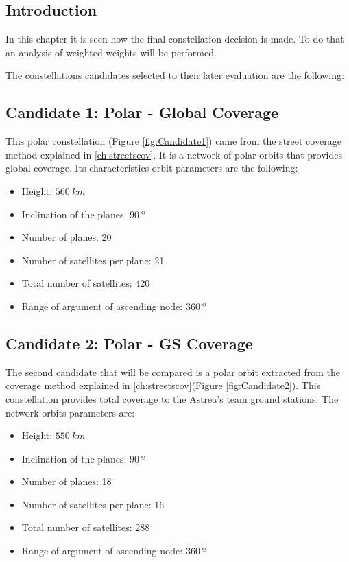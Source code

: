 \subsection{Introduction} 
In this chapter it is seen how the final constellation decision is made. To do that an analysis of weighted weights will be performed.

The constellations candidates selected to their later evaluation are the following:

\subsection{Candidate 1: Polar - Global Coverage}

This polar constellation (Figure \ref{fig:Candidate1}) came from the street coverage method explained in \ref{ch:streetscov}. It is a network of polar orbits that provides global coverage. Its characteristics orbit parameters are the following:

\begin{itemize}
\item Height: $560~{km}$ 
\item Inclination of the planes: $90~{º}$  
\item Number of planes: 20
\item Number of satellites per plane: 21
\item Total number of satellites: 420
\item Range of argument of ascending node: $360~{º}$ 
\end{itemize}


\subsection{Candidate 2: Polar - GS Coverage}
 
The second candidate that will be compared is a polar orbit extracted from the coverage method explained in \ref{ch:streetscov}(Figure \ref{fig:Candidate2}). This constellation provides total coverage to the Astrea's team ground stations. The network orbits parameters are:

\begin{itemize}
\item Height: $550~{km}$ 
\item Inclination of the planes: $90~{º}$  
\item Number of planes: 18
\item Number of satellites per plane: 16
\item Total number of satellites: 288
\item Range of argument of ascending node: $360~{º}$ 
\end{itemize}


